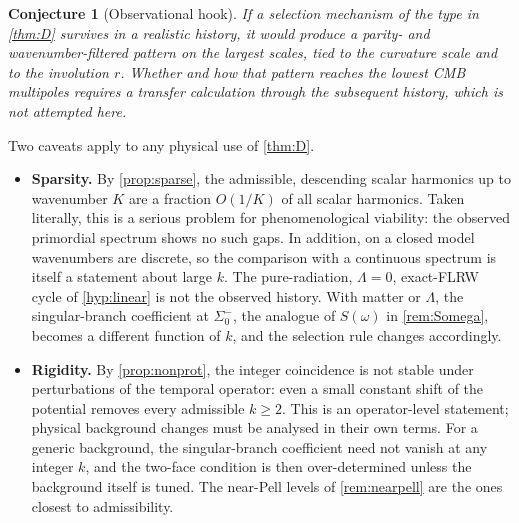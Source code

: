 \documentclass[11pt]{article}
\theoremstyle{canonmath}
\theoremstyle{canonpostulate}
\theoremstyle{canonproposition}
\theoremstyle{canonmath}
\theoremstyle{canonproposition}
\newtheorem{conjecture}{Conjecture}[section]
\begin{document}
\begin{conjecture}[Observational hook]\label{conj:cmb}
If a selection mechanism of the type in \cref{thm:D} survives in a realistic history, it would produce a parity- and wavenumber-filtered pattern on the largest scales, tied to the curvature scale and to the involution $r$. Whether and how that pattern reaches the lowest CMB multipoles requires a transfer calculation through the subsequent history, which is not attempted here.
\end{conjecture}

Two caveats apply to any physical use of \cref{thm:D}.

\begin{itemize}
\item \textbf{Sparsity.} By \cref{prop:sparse}, the admissible, descending scalar harmonics up to wavenumber $K$ are a fraction $O(1/K)$ of all scalar harmonics. Taken literally, this is a serious problem for phenomenological viability: the observed primordial spectrum shows no such gaps. In addition, on a closed model wavenumbers are discrete, so the comparison with a continuous spectrum is itself a statement about large $k$. The pure-radiation, $\Lambda=0$, exact-FLRW cycle of \ref{hyp:linear} is not the observed history. With matter or $\Lambda$, the singular-branch coefficient at $\Sigma_0^-$, the analogue of $S(\omega)$ in \cref{rem:Somega}, becomes a different function of $k$, and the selection rule changes accordingly.
\item \textbf{Rigidity.} By \cref{prop:nonprot}, the integer coincidence is not stable under perturbations of the temporal operator: even a small constant shift of the potential removes every admissible $k\ge2$. This is an operator-level statement; physical background changes must be analysed in their own terms. For a generic background, the singular-branch coefficient need not vanish at any integer $k$, and the two-face condition is then over-determined unless the background itself is tuned. The near-Pell levels of \cref{rem:nearpell} are the ones closest to admissibility.
\end{itemize}
\end{document}
